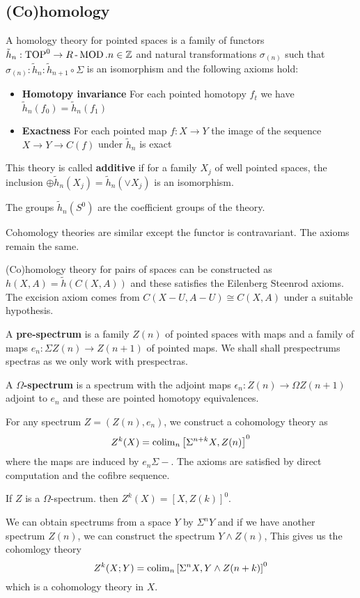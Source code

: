 \subsection{(Co)homology}

A homology theory for pointed spaces is a family of functors $\tilde h_n:\operatorname{TOP}^0\to R\operatorname{-}\operatorname{MOD}.n\in\mathbb Z$ and natural transformations $\sigma_{(n)}$ such that $\sigma_{(n)}:\tilde h_n:\tilde h_{n+1}\circ\Sigma$ is an isomorphism and the following axioms hold:
\begin{itemize}
    \item \textbf{Homotopy invariance} For each pointed homotopy $f_t$ we have $\tilde h_n(f_0)=\tilde h_n(f_1)$
    \item \textbf{Exactness} For each pointed map $f:X\to Y$ the image of the sequence $X\to Y\to C(f)$ under $\tilde h_n$ is exact
\end{itemize}

This theory is called \textbf{additive} if for a family $X_j$ of well pointed spaces, the inclusion $\oplus\tilde h_n(X_j)=\tilde h_n\left(\vee X_j\right)$ is an isomorphism.

The groups $\tilde h_n(S^0)$ are the coefficient groups of the theory.

Cohomology theories are similar except the functor is contravariant. The axioms remain the same.

(Co)homology theory for pairs of spaces can be constructed as $h(X,A)=\tilde h(C(X,A))$ and these satisfies the Eilenberg Steenrod axioms. The excision axiom comes from $C(X-U,A-U)\cong C(X,A)$ under a suitable hypothesis.

A \textbf{pre-spectrum} is a family $Z(n)$ of pointed spaces with maps and a family of maps $e_n:\Sigma Z(n)\to Z(n+1)$ of pointed maps. We shall shall prespectrums spectras as we only work with prespectras.

A \textbf{$\Omega$-spectrum} is a spectrum with the adjoint maps $\epsilon_n:Z(n)\to\Omega Z(n+1)$ adjoint to $e_n$ and these are pointed homotopy equivalences.

For any spectrum $Z=\left(Z(n),e_n\right)$, we construct a cohomology theory as
\[Z^k(X)=\operatorname{colim}_n\left[\Sigma^{n+k}X,Z(n)\right]^0\]
where the maps are induced by $e_n\Sigma-$. The axioms are satisfied by direct computation and the cofibre sequence.

If $Z$ is a $\Omega$-spectrum. then $Z^k(X)=\left[X,Z(k)\right]^0$.

We can obtain spectrums from a space $Y$ by $\Sigma^nY$ and if we have another spectrum $Z(n)$, we can construct the spectrum $Y\wedge Z(n)$, This gives us the cohomlogy theory
\[Z^k(X;Y)=\operatorname{colim}_n\left[\Sigma^nX,Y\wedge Z(n+k)\right]^0\]
which is a cohomology theory in $X$.

